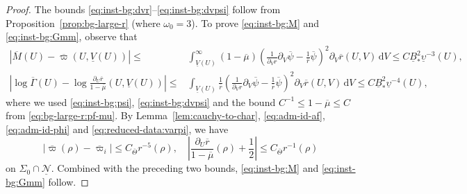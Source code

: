 \documentclass[10pt, reqno]{amsart}
\theoremstyle{definition}
\theoremstyle{remark}
\theoremstyle{conjecture}
\numberwithin{equation}{section}
\newcommand{\ud}{\mathrm{d}}
\newcommand{\rd}{\partial}
\newcommand{\0}{\emptyset}
\newcommand{\Gmm}{\Gamma}
\newcommand{\Sgm}{\Sigma}
\newcommand{\Tht}{\Theta}
\newcommand{\omg}{\omega}
\newcommand{\ups}{\upsilon}
\newcommand{\calN}{\mathcal N}
\newcommand{\psibg}{\overline{\psi}}				%
\newcommand{\rbg}{\overline{r}}					%
\newcommand{\varpibg}{\overline{\varpi}}				%
\newcommand{\mubg}{\overline{\mu}}				%
\newcommand{\Abs}[1]{\left\vert #1 \right\vert}
\begin{document}
\begin{proof}
The bounds \eqref{eq:inst-bg:dvr}--\eqref{eq:inst-bg:dvpsi} follow from Proposition~\ref{prop:bg-large-r} (where $\omg_{0} = 3$). To prove \eqref{eq:inst-bg:M} and \eqref{eq:inst-bg:Gmm}, observe that
\begin{align*}
	\Abs{\overline{M} (U) - \varpibg (U, \underline{V}(U))} 
	\leq & \int_{\underline{V}(U)}^{\infty} (1-\mubg) \left( \frac{1}{\rd_{V} r} \rd_{V} \psibg - \frac{1}{\rbg} \psibg \right)^{2} \rd_{V} \rbg (U, V) \, \ud V 
	\leq C \underline{B}_{\ast}^{2} \underline{\ups}^{-3}(U), \\
	\Abs{\log \overline{\Gmm}(U) - \log \frac{\rd_{U} \rbg}{1-\mubg}(U, \underline{V}(U))} 
	\leq & \int_{\underline{V}(U)} \frac{1}{\rbg} \left( \frac{1}{\rd_{V} r} \rd_{V} \psibg - \frac{1}{\rbg} \psibg \right)^{2} \rd_{V} \rbg  (U, V) \, \ud V 
	\leq C \underline{B}_{\ast}^{2} \underline{\ups}^{-4}(U),
\end{align*}
where we used \eqref{eq:inst-bg:psi}, \eqref{eq:inst-bg:dvpsi} and the bound $C^{-1} \leq 1-\overline{\mu} \leq C$ from \eqref{eq:bg-large-r:pf-mu}. By Lemma~\ref{lem:cauchy-to-char}, \eqref{eq:adm-id-af}, \eqref{eq:adm-id-phi} and \eqref{eq:reduced-data:varpi}, we have
\begin{equation*}
	\Abs{\varpibg(\rho) - \varpibg_{i}} \leq C_{\overline{\Tht}} r^{-5}(\rho), \quad
	\Abs{\frac{\rd_{U} \rbg}{1-\mubg}(\rho) + \frac{1}{2}} \leq C_{\overline{\Tht}} r^{-1}(\rho)
\end{equation*}
on $\Sgm_{0} \cap \underline{\calN}$. Combined with the preceding two bounds,  \eqref{eq:inst-bg:M} and \eqref{eq:inst-bg:Gmm} follow. \qedhere
\end{proof}
\end{document}
